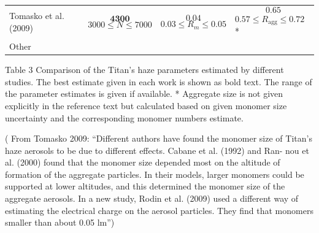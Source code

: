 \documentclass[final,5p,times,twocolumn]{elsarticle}
\begin{document}
\begin{longtable}[]{@{}llll@{}}
\begin{minipage}[t]{0.24\columnwidth}
Tomasko et al. (2009)\strut
\end{minipage} & \begin{minipage}[t]{0.24\columnwidth}\raggedright\strut
\[\ \mathbf{4300}\ \] \[3000\leq N\leq 7000\]\strut
\end{minipage} & \begin{minipage}[t]{0.24\columnwidth}\raggedright\strut
\[\mathbf{0.04}\] \[0.03\leq R_{m}\leq 0.05\]\strut
\end{minipage} & \begin{minipage}[t]{0.24\columnwidth}\raggedright\strut
\[\ \mathbf{0.65}\] \(0.57\leq R_{\text{agg}}\leq 0.72\) *\strut
\end{minipage}\tabularnewline
\begin{minipage}[t]{0.22\columnwidth}\raggedright\strut
Other\strut
\end{minipage} & \begin{minipage}[t]{0.22\columnwidth}\raggedright\strut
\strut
\end{minipage} & \begin{minipage}[t]{0.22\columnwidth}\raggedright\strut
\strut
\end{minipage} & \begin{minipage}[t]{0.22\columnwidth}\raggedright\strut
\strut
\end{minipage}\tabularnewline
\bottomrule
\end{longtable}

Table 3 Comparison of the Titan's haze parameters estimated by different
studies. The best estimate given in each work is shown as bold text. The
range of the parameter estimates is given if available. * Aggregate size
is not given explicitly in the reference text but calculated based on
given monomer size uncertainty and the corresponding monomer numbers
estimate.

( From Tomasko 2009: ``Different authors have found the monomer size of
Titan's haze aerosols to be due to different effects. Cabane et al.
(1992) and Ran- nou et al. (2000) found that the monomer size depended
most on the altitude of formation of the aggregate particles. In their
models, larger monomers could be supported at lower altitudes, and this
determined the monomer size of the aggregate aerosols. In a new study,
Rodin et al. (2009) used a different way of estimating the electrical
charge on the aerosol particles. They find that monomers smaller than
about 0.05 lm'')
\end{document}
